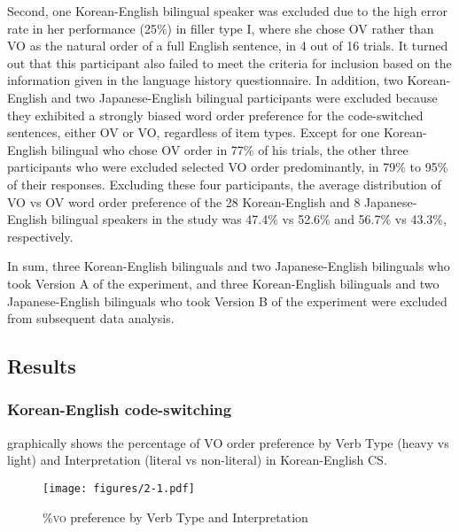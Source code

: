 Second, one Korean-English bilingual speaker was excluded due to the high error rate in her performance (25\%) in filler type I, where she chose \ac{OV} rather than \ac{VO} as the natural order of a full English sentence, in 4 out of 16 trials. It turned out that this participant also failed to meet the criteria for inclusion based on the information given in the language history questionnaire. In addition, two Korean-English and two Japanese-English bilingual participants were excluded because they exhibited a strongly biased word order preference for the code-switched sentences, either \ac{OV} or \ac{VO}, regardless of item types. Except for one Korean-English bilingual who chose \ac{OV} order in 77\% of his trials, the other three participants who were excluded selected \ac{VO} order predominantly, in 79\% to 95\% of their responses. Excluding these four participants, the average distribution of \ac{VO} vs \ac{OV} word order preference of the 28 Korean-English and 8 Japanese-English bilingual speakers in the study was 47.4\% vs 52.6\% and 56.7\% vs 43.3\%, respectively.

In sum, three Korean-English bilinguals and two Japanese-English bilinguals who took Version A of the experiment, and three Korean-English bilinguals and two Japanese-English bilinguals who took Version B of the experiment were excluded from subsequent data analysis.

\subsection{Results} \label{ch2:sect:2.1.5}

\subsubsection{Korean-English code-switching}\label{ch2:sect:2.1.5.1} 

 graphically shows the percentage of \ac{VO} order preference by Verb Type (heavy vs light) and Interpretation (literal vs non-literal) in Korean-English \ac{CS}.

\begin{figure}
\texttt{[image: figures/2-1.pdf]}
 \caption{\%\textsc{vo} preference by Verb Type and Interpretation} 
\label{fig:2.1}
\end{figure}

